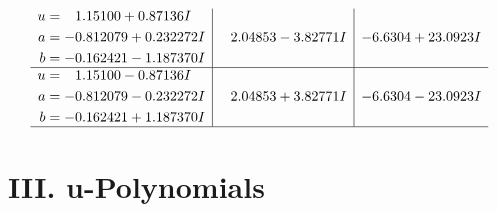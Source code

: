 \documentclass[1p]{elsarticle_modified}
\theoremstyle{definition}
\begin{document}
$$\begin{array}{c|c|c}
\begin{aligned}
u &= \phantom{-}1.15100 + 0.87136 I \\
a &= -0.812079 + 0.232272 I \\
b &= -0.162421 - 1.187370 I\end{aligned}
 & \phantom{-}2.04853 - 3.82771 I & -6.6304 + 23.0923 I \\ \hline\begin{aligned}
u &= \phantom{-}1.15100 - 0.87136 I \\
a &= -0.812079 - 0.232272 I \\
b &= -0.162421 + 1.187370 I\end{aligned}
 & \phantom{-}2.04853 + 3.82771 I & -6.6304 - 23.0923 I\\
 \hline 
 \end{array}$$\newpage
\newpage\renewcommand{\arraystretch}{1}
\centering \section*{ III. u-Polynomials}
\end{document}
